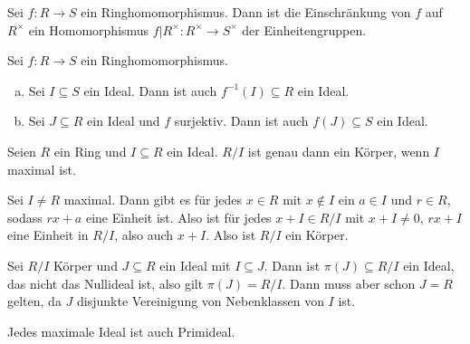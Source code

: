 \begin{lemma}
  Sei \(f:R\to S\) ein Ringhomomorphismus.
  Dann ist die Einschränkung von \(f\) auf \(R^\times\) ein Homomorphismus \(f|R^\times:R^\times\to S^\times\) der Einheitengruppen. 
\end{lemma}

\begin{lemma}
  Sei \(f:R\to S\) ein Ringhomomorphismus.
  \begin{enumerate}[(a)]
  \item Sei \(I\subseteq S\) ein Ideal.
    Dann ist auch \(f^{-1}(I)\subseteq R\) ein Ideal.
  \item Sei \(J\subseteq R\) ein Ideal und \(f\) surjektiv.
    Dann ist auch \(f(J)\subseteq S\) ein Ideal.
  \end{enumerate}
\end{lemma}

\begin{satz}
  Seien \(R\) ein Ring und \(I\subseteq R\) ein Ideal.
  \(R/I\) ist genau dann ein Körper, wenn \(I\) maximal ist.
\end{satz}

\begin{beweis}
  Sei \(I\neq R\) maximal. Dann gibt es für jedes \(x\in R\) mit \(x\notin I\) ein \(a\in I\) und \(r\in R\), sodass \(rx+a\) eine Einheit ist.
  Also ist für jedes \(x+I\in R/I\) mit \(x+I\neq 0\), \(rx+I\) eine Einheit in \(R/I\), also auch \(x+I\). Also ist \(R/I\) ein Körper.

  Sei \(R/I\) Körper und \(J\subseteq R\) ein Ideal mit \(I\subseteq J\).
  Dann ist \(\pi(J)\subseteq R/I\) ein Ideal, das nicht das Nullideal ist,
  also gilt \(\pi(J)=R/I\).
  Dann muss aber schon \(J=R\) gelten, da \(J\) disjunkte Vereinigung von Nebenklassen von \(I\) ist.
\end{beweis}

\begin{korollar}
  Jedes maximale Ideal ist auch Primideal.
\end{korollar}
